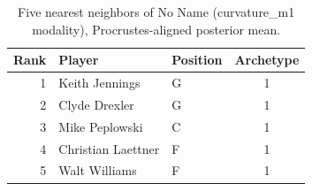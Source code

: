 \begin{table}[htbp]
  \centering\small
  \begin{tabular}{rllc}
    \toprule
    Rank & Player & Position & Archetype \\
    \midrule
    1 & Keith Jennings & G & 1 \\
    2 & Clyde Drexler & G & 1 \\
    3 & Mike Peplowski & C & 1 \\
    4 & Christian Laettner & F & 1 \\
    5 & Walt Williams & F & 1 \\
    \bottomrule
  \end{tabular}
  \caption{Five nearest neighbors of No Name (curvature_m1 modality), Procrustes-aligned posterior mean.}
  \label{tab:No_Name_neighbors_curvature_m1}
\end{table}

